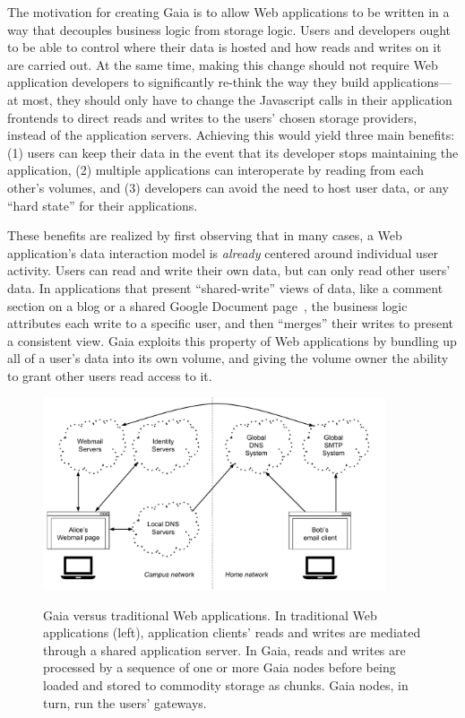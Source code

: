 The motivation for creating Gaia is to allow Web applications to be written in a
way that decouples business logic from storage logic.  Users and developers
ought to be able to control where their data is hosted and how reads and writes
on it are carried out.  At the same time, making this change should not require
Web application developers to significantly re-think the way they build
applications---at most, they should only have to change the Javascript calls in
their application frontends to direct reads and writes to the users' chosen
storage providers, instead of the application servers.  Achieving this would
yield three main benefits:  (1) users can keep their data in the
event that its developer stops maintaining the application, (2) multiple
applications can interoperate by reading from each other's volumes, and
(3) developers can avoid the need to host user data, or any ``hard state'' for
their applications.

These benefits are realized by first observing that in many cases,
a Web application's data interaction model is \emph{already} centered around
individual user activity.  Users can read and write their own data, but can
only read other users' data.
In applications that present ``shared-write'' views of data, like a comment section on a blog or
a shared Google Document page~\cite{google-docs}, the business logic
attributes each write to a specific user, and then ``merges'' their
writes to present a consistent view.  Gaia exploits this property of Web
applications by bundling up all of a user's data into its own volume, and giving
the volume owner the ability to grant other users read access to it.

\begin{figure}[h]
   \caption{Gaia versus traditional Web applications.  In traditional Web
   applications (left), application clients' reads and writes are mediated
   through a shared application server.  In Gaia, reads and writes are processed
   by a sequence of one or more Gaia nodes before being loaded and stored to
   commodity storage as chunks.  Gaia nodes, in turn, run the users' gateways.}
   \centering
   \includegraphics[width=0.9\textwidth,page=16]{figures/dissertation-figures}
   \label{fig:chap3-gaia-vs-traditional-web}
\end{figure}

